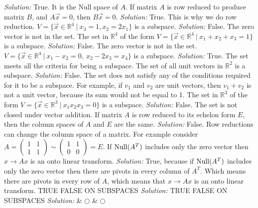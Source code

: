     \ifnum {} {\color{DarkBlue} \textit{Solution:  } True. It is the Null space of $A$.   } \fi
\fi     
\ifnum {}
    If matrix $A$ is row reduced to produce matrix $B$, and 
    $A\vec x =0 $, then $B \vec x =0$. 
    \ifnum {} {\color{DarkBlue} \textit{Solution:  }  True. This is why we do row reduction.  } \fi
\fi     
\ifnum {}
    $V=\{ \vec x \in \mathbb R^4 \ | \ x_3 = 1, x_2=2x_1\}$ is a subspace.
    \ifnum {} {\color{DarkBlue} \textit{Solution: } False. The zero vector is not in the set.} \fi
\fi     
\ifnum {}
    The set in $\mathbb R^4$ of the form  $V=\{ \vec x \in \mathbb R^4 \ | \ x_1 + x_2 + x_3 =1\}$ is a subspace.
    \ifnum {} {\color{DarkBlue} \textit{Solution: } False. 
    The zero vector is not in the set.} 
    \fi
\fi     
\ifnum {}
    $V=\{ \vec x \in \mathbb R^4 \ | \ x_1 - x_2 = 0, \ x_2-2x_3 = x_4 \}$ is a subspace.
    \ifnum {} {\color{DarkBlue} \textit{Solution: } True. The set meets all the criteria for being a subspace.}  \fi
\fi     
\ifnum {}
    The set of all unit vectors in $\mathbb R^2$ is a subspace. 
    \ifnum {} {\color{DarkBlue} \textit{Solution:  } False. The set does not satisfy any of the conditions required for it to be a subspace. For example, if $v_1$ and $v_2$ are unit vectors, then $v_1+v_2$ is not a unit vector, because its sum would not be equal to 1.  } \fi
\fi    
\ifnum {}
    The set in $\mathbb R^3$ of the form  $V=\{ \vec x \in \mathbb R^3 \ | \ x_1 x_2 x_3 =0\}$ is a subspace.
    \ifnum {} {\color{DarkBlue} \textit{Solution: } False. 
    The set is not closed under vector addition.} 
    \fi
\fi    
\ifnum {}
    If matrix $A$ is row reduced to its echelon form $E$, then the column spaces of $A$ and $E$ are the same.  
    \ifnum {} {\color{DarkBlue} \textit{Solution:  } False. Row reductions can change the column space of a matrix. For example consider \setlength{\extrarowheight}{0.0cm} $A = \begin{pmatrix} 1&1\\1&1\end{pmatrix} \sim \begin{pmatrix} 1&1\\0&0\end{pmatrix} = E$. } \fi
\fi    
\ifnum {}
   If $\text{Null}(A^T)$ includes only the zero vector then $x\to Ax$ is an onto linear transform.
    \ifnum {} {\color{DarkBlue} \textit{Solution:  } True, because if $\text{Null}(A^T)$ includes only the zero vector then there are pivots in every column of $A^T$. Which means there are pivots in every row of $A$, which means that $x\to Ax$ is an onto linear transform. } \fi
\fi    
\ifnum {}
   TRUE FALSE ON SUBSPACES
    \ifnum {} {\color{DarkBlue} \textit{Solution:  }  } \fi
\fi    
\ifnum {}
   TRUE FALSE ON SUBSPACES
    \ifnum {} {\color{DarkBlue} \textit{Solution:  }  } \fi
\fi    
& $\bigcirc$  & $\bigcirc$ \\   
   
